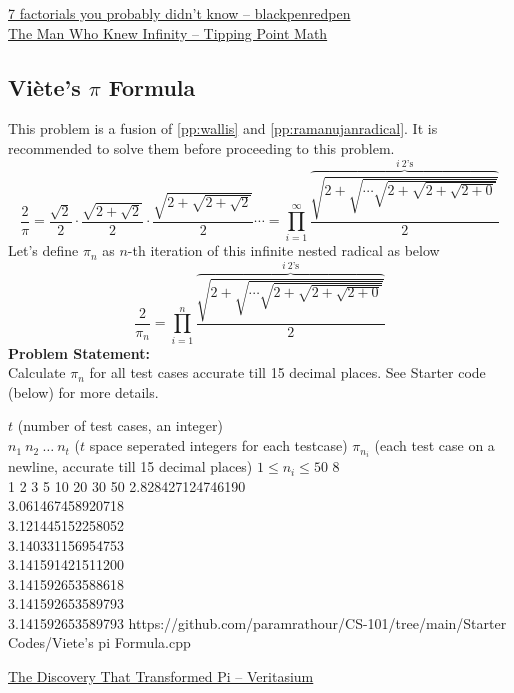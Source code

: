\begin{funvideo}
\href{https://youtu.be/7eboFOkRHr4}{7 factorials you probably didn't know -- blackpenredpen}
\\\href{https://youtu.be/P0idBBhGNgU}{The Man Who Knew Infinity -- Tipping Point Math}
\end{funvideo}
\subsection{Viète's $\pi$ Formula}{\label{pp:vietesformula}}
This problem is a fusion of \ref{pp:wallis} and \ref{pp:ramanujanradical}. It is recommended to solve them before proceeding to this problem.
\begin{equation}
{ {\frac {2}{\pi }}={\frac {\sqrt {2}}{2}}\cdot {\frac {\sqrt {2+{\sqrt {2}}}}{2}}\cdot {\frac {\sqrt {2+{\sqrt {2+{\sqrt {2}}}}}}{2}}\cdots = \prod_{i = 1}^{\infty} \frac{\overbrace{\sqrt{2+\sqrt{\cdots{\sqrt{2+{\sqrt{2+\sqrt{2+0}}}}}}}}^{i\ 2\text{'s}}}{2}}
	\end{equation}
Let's define $\pi_n$ as $n$-th iteration of this infinite nested radical as below
\begin{equation*}
\frac{2}{\pi_n} = \prod_{i = 1}^{n} \frac{\overbrace{\sqrt{2+\sqrt{\cdots{\sqrt{2+{\sqrt{2+\sqrt{2+0}}}}}}}}^{i\ 2\text{'s}}}{2}
\end{equation*}
\textbf{Problem Statement:}\\
Calculate $\pi_n$ for all test cases accurate till 15 decimal places. See Starter code (below) for more details.
\begin{testcases}
	{$t$ \hfill(number of test cases, an integer)\\$n_1\ n_2\ \ldots\ n_t$ \hfill($t$ space seperated integers for each testcase)}
	{$\pi_{n_i}$ \hfill(each test case on a newline, accurate till 15 decimal places)}
	{$1 \leq n_i \leq 50$}
	{8\\1 2 3 5 10 20 30 50}
	{2.828427124746190\\3.061467458920718\\3.121445152258052\\3.140331156954753\\3.141591421511200\\3.141592653588618\\3.141592653589793\\3.141592653589793}
	{https://github.com/paramrathour/CS-101/tree/main/Starter Codes/Viete's pi Formula.cpp}
\end{testcases}
\begin{funvideo}
\href{https://youtu.be/gMlf1ELvRzc}{The Discovery That Transformed Pi -- Veritasium}
\end{funvideo}
